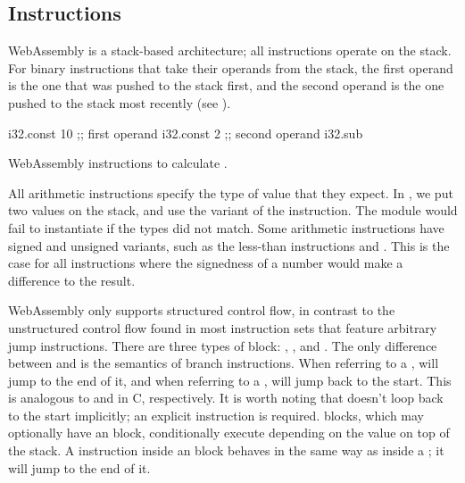 \documentclass[00-main.tex]{subfiles}
\begin{document}
\subsection{Instructions}

WebAssembly is a stack-based architecture; all instructions operate on the stack.
For binary instructions that take their operands from the stack, the first operand is the one that was pushed to the stack first, and the second operand is the one pushed to the stack most recently (see ).

\begin{listing}[t]
  \begin{WasmListing}
    i32.const 10 ;; first operand
    i32.const 2  ;; second operand
    i32.sub
  \end{WasmListing}
  \caption{WebAssembly instructions to calculate .}
  \label{lst:wasm example sub instr}
\end{listing}

All arithmetic instructions specify the type of value that they expect. In , we put two  values on the stack, and use the  variant of the  instruction.
The module would fail to instantiate if the types did not match.
Some arithmetic instructions have signed and unsigned variants, such as the less-than instructions  and .
This is the case for all instructions where the signedness of a number would make a difference to the result.

WebAssembly only supports structured control flow, in contrast to the unstructured control flow found in most instruction sets that feature arbitrary jump instructions.
There are three types of block: , , and .
The only difference between  and  is the semantics of branch instructions.
When referring to a ,  will jump to the end of it, and when referring to a ,  will jump back to the start.
This is analogous to  and  in C, respectively.
It is worth noting that  doesn't loop back to the start implicitly; an explicit  instruction is required.
 blocks, which may optionally have an  block, conditionally execute depending on the value on top of the stack.
A  instruction inside an  block behaves in the same way as inside a ; it will jump to the end of it.
\end{document}
